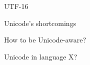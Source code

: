 \documentclass[../index.tex]{subfiles}
\begin{document}
\renewcommand{\currenttitle}{UTF-16}
\begin{frame}{\currenttitle}
\end{frame}

\renewcommand{\currenttitle}{Unicode's shortcomings}
\begin{frame}{\currenttitle}
\end{frame}

\renewcommand{\currenttitle}{How to be Unicode-aware?}
\begin{frame}{\currenttitle}
\end{frame}

\renewcommand{\currenttitle}{Unicode in language X?}
\begin{frame}{\currenttitle}
\end{frame}

\end{document}
